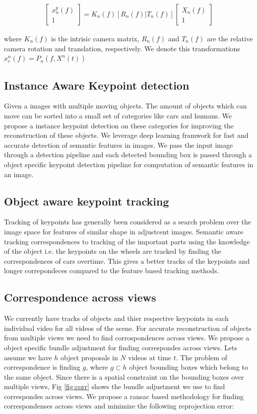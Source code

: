 \documentclass[10pt,twocolumn,letterpaper]{article}
\begin{document}
\begin{align*}
 \begin{bmatrix} x_n^p(f) \\ 1  \end{bmatrix} = K_n(f)[R_n(f) | T_n(f)] \begin{bmatrix} X_n(f) \\ 1  \end{bmatrix}
\end{align*} 

where $K_n(f)$ is the intrisic camera matrix, $R_n(f)$ and $T_n(f)$ are the relative camera rotation and translation, respectively. We denote this transformations $x_c^n(f) = P_n(f,X^n(t))$
\subsection{Instance Aware Keypoint detection}
Given a images with multiple moving objects. The amount of objects which can move can be sorted into a small set of categories like cars and humans. We propose a instance keypoint detection on these categories for improving the reconstruction of these objects. We leverage deep learning framwork for fast and accurate detection of semantic features in images. We pass the input image through a detection pipeline and each detected bounding box is passed through a object specific keypoint detection pipeline for computation of semantic features in an image.  

\subsection{Object aware keypoint tracking}
Tracking of keypoints has generally been considered as a search problem over the image space for features of similar shape in adjustcent images. Semantic aware tracking correspondences to tracking of the important parts using the knowledge of the object i.e. the keypoints on the wheels are tracked by finding the correspondences of cars overtime. This gives a better tracks of the keypoints and longer correpondeces compared to the feature based tracking methods. 

\subsection{Correspondence across views}
We currently have tracks of objects and thier respective keypoints in each individual video for all videos of the scene. For accurate reconstruction of objects from multiple views we need to find corrospondences across views. We propose a object specific bundle adjustment for finding correspondes across views. Lets assume we have $h$ object proposals in $N$ videos at time $t$. The problem of correspondence is finding $g$, where $g \subset h$ object bounding boxes which belong to the same object. Since there is a spatial constraint on the bounding boxes over multiple views, Fig \ref{fig:corr} shows the bundle adjustment we use to find correspondes across views. We propose a ransac based methodology for finding correspondenses across views and minimize the following reprojection error:
\end{document}
